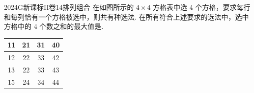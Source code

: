 
\begin{problem}{2024}{G}{新课标II卷}{14}{排列组合}
在如图所示的 $4\times 4$ 方格表中选 4 个方格，要求每行和每列恰有一个方格被选中，则共有\underline{\hspace{4em}}种选法. 在所有符合上述要求的选法中，选中方格中的 4 个数之和的最大值是\underline{\hspace{4em}}.
\begin{center}
\begin{tabular}{|c|c|c|c|}
\hline
11 & 21 & 31 & 40 \\
\hline
12 & 22 & 33 & 42 \\
\hline
13 & 22 & 33 & 43 \\
\hline
15 & 24 & 34 & 44 \\
\hline
\end{tabular}
\end{center}
\end{problem}